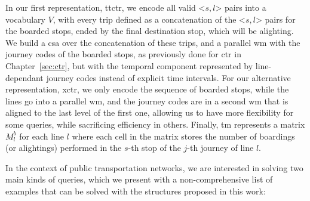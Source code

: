     In our first representation, \gls{ttctr}, we encode all valid <$s,l$> pairs into a vocabulary $V$, with every trip defined as a concatenation of the <$s,l$> pairs for the boarded stops, ended by the final destination stop, which will be alighting. We build a \gls{csa} over the concatenation of these trips, and a parallel \gls{wm} with the journey codes of the boarded stops, as previously done for \gls{ctr} in Chapter~\ref{sec:ctr}, but with the temporal component represented by line-dependant journey codes instead of explicit time intervals. For our alternative representation, \gls{xctr}, we only encode the sequence of boarded stops, while the lines go into a parallel \gls{wm}, and the journey codes are in a second \gls{wm} that is aligned to the last level of the first one, allowing us to have more flexibility for some queries, while sacrificing efficiency in others. Finally, \gls{tm} represents a matrix $M^b_l$ for each line $l$ where each cell in the matrix stores the number of boardings (or alightings) performed in the $s$-th stop of the $j$-th journey of line $l$.
	
	\medskip
	In the context of public transportation networks, we are interested in solving two main kinds of queries, which we present with a non-comprehensive list of examples that can be solved with the structures proposed in this work:

